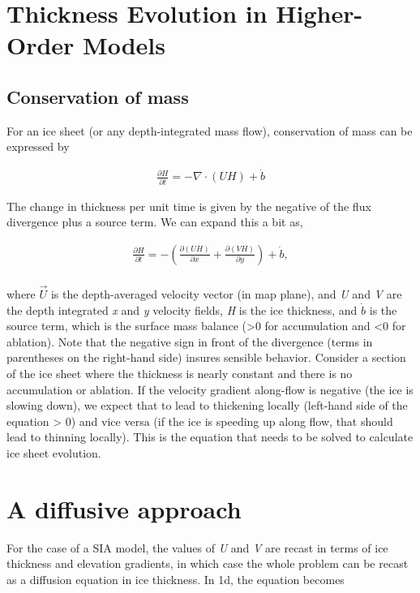 
\section{Thickness Evolution in Higher-Order Models}
\label{sc:ho-thickness-evol}

\subsection{Conservation of mass}
For an ice sheet (or any depth-integrated mass flow), conservation of mass can be expressed by

\begin{align*}
\frac{\partial H}{\partial t}=-\nabla \cdot \left( UH \right)+\dot{b}
\end{align*}

The change in thickness per unit time is given by the negative of the flux divergence plus a source term. We can expand this a bit as,


\begin{align*}\frac{\partial H}{\partial t}=-\left( \frac{\partial \left( UH \right)}{\partial x}+\frac{\partial \left( VH \right)}{\partial y} \right)+\dot{b}, \\ 
\end{align*}

where $\vec{U}$ is the depth-averaged velocity vector (in map plane), and \textit{U} and \textit{V} are the depth integrated \textit{x} and \textit{y} velocity fields, \textit{H} is the ice thickness, and $\dot{b}$ is the source term, which is the surface mass balance (>0 for accumulation and <0 for ablation). Note that the negative sign in front of the divergence (terms in parentheses on the right-hand side) insures sensible behavior. Consider a section of the ice sheet where the thickness is nearly constant and there is no accumulation or ablation. If the velocity gradient along-flow is negative (the ice is slowing down), we expect that to lead to thickening locally (left-hand side of the equation > 0) and vice versa (if the ice is speeding up along flow, that should lead to thinning locally). This is the equation that needs to be solved to calculate ice sheet evolution.

\section{A diffusive approach}
For the case of a SIA model, the values of \textit{U} and \textit{V} are recast in terms of ice thickness and elevation gradients, in which case the whole problem can be recast as a diffusion equation in ice thickness. In 1d, the equation becomes


